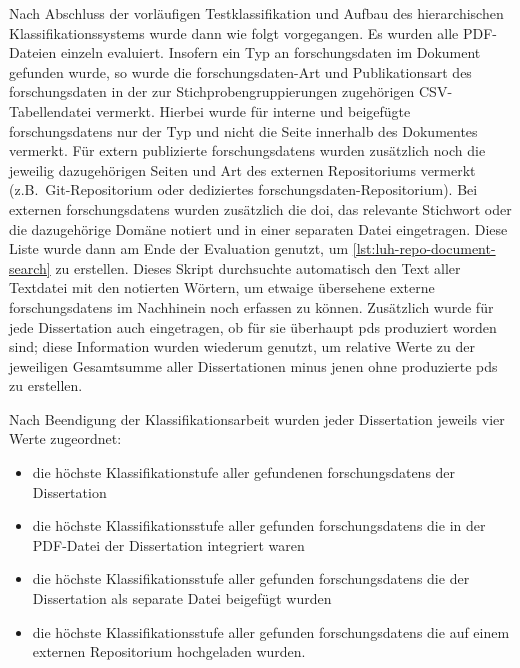 Nach Abschluss der vorläufigen Testklassifikation und Aufbau des hierarchischen Klassifikationssystems wurde dann wie folgt vorgegangen.
Es wurden alle PDF-Dateien einzeln evaluiert.
Insofern ein Typ an \gls{forschungsdaten} im Dokument gefunden wurde, so wurde die \gls{forschungsdaten}-Art und Publikationsart des \gls{forschungsdaten} in der zur Stichprobengruppierungen zugehörigen CSV-Tabellendatei vermerkt.
Hierbei wurde für interne und beigefügte \glspl{forschungsdaten} nur der Typ und nicht die Seite innerhalb des Dokumentes vermerkt.
Für extern publizierte \glspl{forschungsdaten} wurden zusätzlich noch die jeweilig dazugehörigen Seiten und Art des externen Repositoriums vermerkt (z.B.~Git-Repositorium oder dediziertes \gls{forschungsdaten}-Repositorium).
Bei externen \glspl{forschungsdaten} wurden zusätzlich die \gls{doi}, das relevante Stichwort oder die dazugehörige Domäne notiert und in einer separaten Datei eingetragen.
Diese Liste wurde dann am Ende der Evaluation genutzt, um \cref{lst:luh-repo-document-search} zu erstellen.
Dieses Skript durchsuchte automatisch den Text aller Textdatei mit den notierten Wörtern, um etwaige übersehene externe \glspl{forschungsdaten} im Nachhinein noch erfassen zu können.
Zusätzlich wurde für jede Dissertation auch eingetragen, ob für sie überhaupt \glspl{pd} produziert worden sind; diese Information wurden wiederum genutzt, um relative Werte zu der jeweiligen Gesamtsumme aller Dissertationen minus jenen ohne produzierte \glspl{pd} zu erstellen.

Nach Beendigung der Klassifikationsarbeit wurden jeder Dissertation jeweils vier Werte zugeordnet: 
\begin{itemize}
    \item die höchste Klassifikationstufe aller gefundenen \glspl{forschungsdaten} der Dissertation
    \item die höchste Klassifikationsstufe aller gefunden \glspl{forschungsdaten} die in der PDF-Datei der Dissertation integriert waren
    \item die höchste Klassifikationsstufe aller gefunden \glspl{forschungsdaten} die der Dissertation als separate Datei beigefügt wurden
    \item die höchste Klassifikationsstufe aller gefunden \glspl{forschungsdaten} die auf einem externen Repositorium hochgeladen wurden.
\end{itemize}

